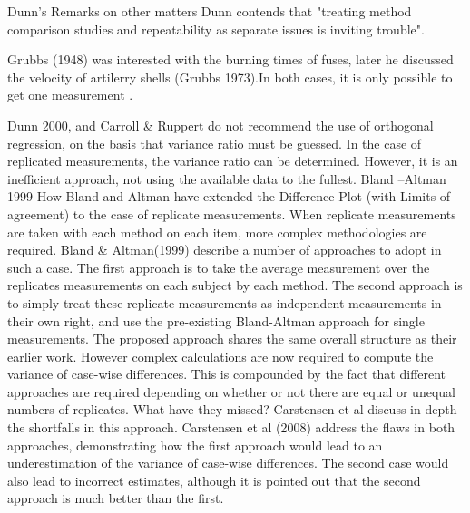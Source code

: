 Dunn’s Remarks on other matters	
Dunn contends that "treating method comparison studies and repeatability as separate issues is inviting trouble".

Grubbs (1948) was interested with the burning times of fuses,  later he discussed the velocity of artilerry shells (Grubbs 1973).In both cases, it is only possible to get one measurement .

Dunn 2000, and Carroll & Ruppert do not recommend the use of orthogonal regression, on the basis that variance ratio must be guessed.  In the case of replicated measurements, the variance ratio can be determined. However, it is an inefficient approach, not using the available data to the fullest.
Bland –Altman 1999
How Bland and Altman have extended the Difference Plot (with Limits of agreement) to the case of replicate measurements.
When replicate measurements are taken with each method on each item, more complex methodologies are required. Bland & Altman(1999) describe a number of approaches to adopt in such a case. The first approach is to take the average measurement over the replicates measurements on each subject by each method.
The second approach is to simply treat these replicate measurements as independent measurements in their own right, and use the pre-existing Bland-Altman approach for single measurements.
The proposed approach shares the same overall structure as their earlier work. However complex calculations are now required to compute the variance of case-wise differences. This is compounded by the fact that different approaches are required depending on whether or not there are equal or unequal numbers of replicates.
What have they missed? Carstensen et al discuss in depth the shortfalls in this approach.
Carstensen et al (2008) address the flaws in both approaches, demonstrating how the first approach would lead to an underestimation of the variance of case-wise differences. The second case would also lead to incorrect estimates, although it is pointed out that the second approach is much better than the first.

